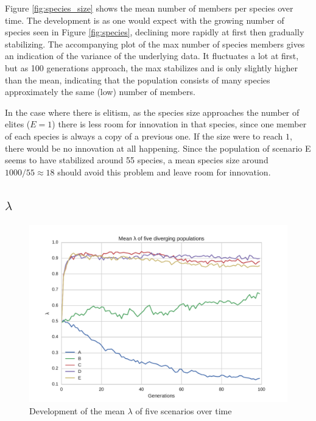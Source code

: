Figure \ref{fig:species_size} shows the mean number of members per species over time.
The development is as one would expect with the growing number of species seen in Figure \ref{fig:species}, declining more rapidly at first then gradually stabilizing.
The accompanying plot of the max number of species members gives an indication of the variance of the underlying data.
It fluctuates a lot at first, but as 100 generations approach,
the max stabilizes and is only slightly higher than the mean, indicating that the population consists of many species approximately the same (low) number of members.

In the case where there is elitism, as the species size approaches the number of elites ($E=1$) there is less room for innovation in that species, since one member of each species is always a copy of a previous one.
If the size were to reach $1$, there would be no innovation at all happening.
Since the population of scenario E seems to have stabilized around 55 species, a mean species size around $1000 / 55 \approx 18$ should avoid this problem and leave room for innovation.

\subsection{$\lambda$}
\begin{figure}
\centering
\includegraphics[width=\columnwidth]{fig/mean_lambda}
\caption{Development of the mean $\lambda$ of five scenarios over time}
\label{fig:lambda_over_t}
\end{figure}

